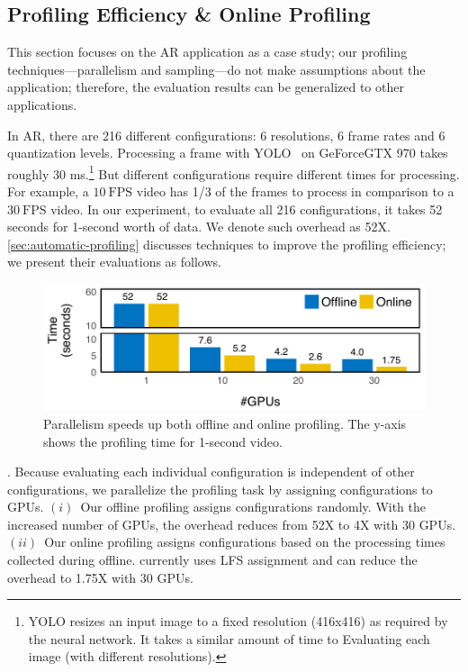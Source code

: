 \subsection{Profiling Efficiency \& Online Profiling}
\label{sec:online-profiling}

This section focuses on the AR application as a case study; our profiling
techniques---parallelism and sampling---do not make assumptions about the
application; therefore, the evaluation results can be generalized to other
applications.

In AR, there are 216 different configurations: 6 resolutions, 6 frame rates and
6 quantization levels. Processing a frame with YOLO~\cite{redmon2016yolo9000} on
GeForce\textregistered\space GTX 970 takes roughly 30 ms.\footnote{YOLO resizes
  an input image to a fixed resolution (416x416) as required by the neural
  network. It takes a similar amount of time to Evaluating each image (with
  different resolutions).} But different configurations require different times
for processing. For example, a \(10~\text{FPS}\) video has 1/3 of the frames to
process in comparison to a \(30~\text{FPS}\) video.  In our experiment, to
evaluate all 216 configurations, it takes 52 seconds for 1-second worth of
data. We denote such overhead as 52X\@. \autoref{sec:automatic-profiling}
discusses techniques to improve the profiling efficiency; we present their
evaluations as follows.

\begin{figure}
  \centering
  \includegraphics[width=1.0\columnwidth]{figures/parallel.pdf}
  \caption{Parallelism speeds up both offline and online profiling.
  The y-axis shows the profiling time for 1-second video.}
  \label{fig:parallel}
\end{figure}

. Because
evaluating each individual configuration is independent of other configurations,
we parallelize the profiling task by assigning configurations to GPUs.
$(i)$~Our offline profiling assigns configurations randomly.  With the increased
number of GPUs, the overhead reduces from 52X to 4X with 30 GPUs.  $(ii)$~Our
online profiling assigns configurations based on the processing times collected
during offline.  \sysname{} currently uses LFS assignment and can reduce the
overhead to 1.75X with 30 GPUs. 

